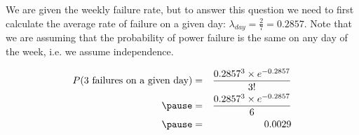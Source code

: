 \documentclass[t,compress,mathserif]{beamer}
\begin{document}

\begin{frame}


\pause

We are given the weekly failure rate, but to answer this question we need to first calculate the average rate of failure on a given day: $\lambda_{day} = \frac{2}{7} = 0.2857$. Note that we are assuming that the probability of power failure is the same on any day of the week, i.e. we assume independence.

\pause

\begin{eqnarray*}
P(\text{3 failures on a given day}) &=& \frac{0.2857^3 \times e^{-0.2857}}{3!} \\
\pause
&=& \frac{0.2857^3 \times e^{-0.2857}}{6} \\
\pause
&=& 0.0029
\end{eqnarray*}

\end{frame}





\end{document}
